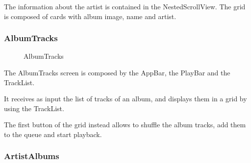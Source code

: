 \documentclass{article}
\begin{document}
The information about the artist is contained in the NestedScrollView. The grid
is composed of cards with album image, name and artist.

\subsubsection{AlbumTracks}

\begin{figure}[H]
	\noindent
	\caption{AlbumTracks} 
\end{figure}

The AlbumTracks screen is composed by the AppBar, the PlayBar and the TrackList.

It receives as input the list of tracks of an album, and displays them in a
grid by using the TrackList.

The first button of the grid instead allows to shuffle the album tracks, add
them to the queue and start playback.

\subsubsection{ArtistAlbums}
\end{document}
